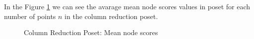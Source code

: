 \documentclass{article}
\begin{document}
\par In the Figure \ref{fig:scores_node_mean_crp} we can see the avarage mean node scores values in poset for each number of points $n$ in the column reduction poset.
\begin{figure}[ht]
  \vspace{-96pt}
  \centering
  \hspace*{-0.18999999999999995\textwidth}
  \caption{Column Reduction Poset: Mean node scores}
  \label{fig:scores_node_mean_crp}
\end{figure}
\end{document}
